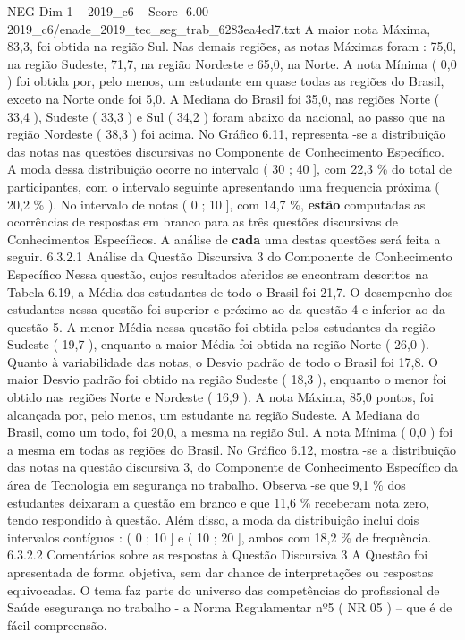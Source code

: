 \begin{textsample}{NEG Dim 1 – 2019\_c6 – Score -6.00 – 2019\_c6/enade\_2019\_tec\_seg\_trab\_6283ea4ed7.txt}
A maior nota Máxima, 83,3, foi obtida na região Sul.
Nas demais regiões, as notas Máximas foram : 75,0, na região Sudeste, 71,7, na região Nordeste e 65,0, na Norte.
A nota Mínima ( 0,0 ) foi obtida por, pelo menos, um estudante em quase todas as regiões do Brasil, exceto na Norte onde foi 5,0.
A Mediana do Brasil foi 35,0, nas regiões Norte ( 33,4 ), Sudeste ( 33,3 ) e Sul ( 34,2 ) foram abaixo da nacional, ao passo que na região Nordeste ( 38,3 ) foi acima.
No Gráfico 6.11, representa -se a distribuição das notas nas questões discursivas no Componente de Conhecimento Específico.
A moda dessa distribuição ocorre no intervalo ( 30 ; 40 ], com 22,3 \% do total de participantes, com o intervalo seguinte apresentando uma frequencia próxima ( 20,2 \% ).
No intervalo de notas ( 0 ; 10 ], com 14,7 \%, \textbf{estão} computadas as ocorrências de respostas em branco para as três questões discursivas de Conhecimentos Específicos.
A análise de \textbf{cada} uma destas questões será feita a seguir. 6.3.2.1 Análise da Questão Discursiva 3 do Componente de Conhecimento Específico Nessa questão, cujos resultados aferidos se encontram descritos na Tabela 6.19, a Média dos estudantes de todo o Brasil foi 21,7.
O desempenho dos estudantes nessa questão foi superior e próximo ao da questão 4 e inferior ao da questão 5.
A menor Média nessa questão foi obtida pelos estudantes da região Sudeste ( 19,7 ), enquanto a maior Média foi obtida na região Norte ( 26,0 ).
Quanto à variabilidade das notas, o Desvio padrão de todo o Brasil foi 17,8.
O maior Desvio padrão foi obtido na região Sudeste ( 18,3 ), enquanto o menor foi obtido nas regiões Norte e Nordeste ( 16,9 ).
A nota Máxima, 85,0 pontos, foi alcançada por, pelo menos, um estudante na região Sudeste.
A Mediana do Brasil, como um todo, foi 20,0, a mesma na região Sul.
A nota Mínima ( 0,0 ) foi a mesma em todas as regiões do Brasil.
No Gráfico 6.12, mostra -se a distribuição das notas na questão discursiva 3, do Componente de Conhecimento Específico da área de Tecnologia em segurança no trabalho.
Observa -se que 9,1 \% dos estudantes deixaram a questão em branco e que 11,6 \% receberam nota zero, tendo respondido à questão.
Além disso, a moda da distribuição inclui dois intervalos contíguos : ( 0 ; 10 ] e ( 10 ; 20 ], ambos com 18,2 \% de frequência. 6.3.2.2 Comentários sobre as respostas à Questão Discursiva 3 A Questão foi apresentada de forma objetiva, sem dar chance de interpretações ou respostas equivocadas.
O tema faz parte do universo das competências do profissional de Saúde esegurança no trabalho - a Norma Regulamentar nº5 ( NR 05 ) – que é de fácil compreensão.

\end{textsample}
